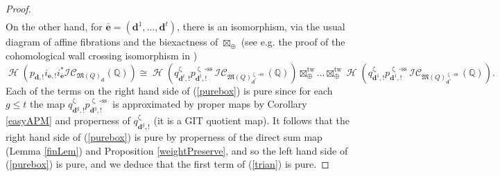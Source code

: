 \documentclass[a4paper,10pt]{amsart}
\newcommand{\dd}{\mathbf{d}}
\newcommand{\ee}{\mathbf{e}}
\newcommand{\Mst}{\mathfrak{M}}
\newcommand{\ICS}{\mathcal{IC}}
\renewcommand{\zeta}{\upzeta}
\DeclareMathOperator{\sst}{-ss}
\DeclareMathOperator{\tw}{tw}
\DeclareMathOperator{\Ho}{\mathcal{H}}
\begin{document}
\begin{proof}
\begin{align}
\end{align}
On the other hand, for $\overline{\ee}=(\dd^1,\ldots,\dd^t)$, there is an isomorphism, via the usual diagram of affine fibrations and the biexactness of $\boxtimes_{\oplus}$ (see e.g. the proof of the cohomological wall crossing isomorphism in \cite[Sec.4.2]{DaMe15b})
\begin{equation}
\label{purebox}
\Ho\left( p_{\dd,!}i_{\overline{\ee},!}i_{\overline{\ee}}^*\ICS_{\Mst(Q)_\dd}(\mathbb{Q})\right)\cong \Ho\left(q^{\zeta}_{\dd^t,!}p^{\zeta\sst}_{\dd^t,!}\ICS_{\Mst(Q)^{\zeta\sst}_{\dd^t}}(\mathbb{Q})\right)\boxtimes_{\oplus}^{\tw}\ldots\boxtimes_{\oplus}^{\tw}\Ho\left(q^{\zeta}_{\dd^1,!}p^{\zeta\sst}_{\dd^1,!}\ICS_{\Mst(Q)^{\zeta\sst}_{\dd^1}}(\mathbb{Q})\right).
\end{equation}
Each of the terms on the right hand side of (\ref{purebox}) is pure since for each $g\leq t$ the map $q^{\zeta}_{\dd^g,!}p^{\zeta\sst}_{\dd^g,!}$ is approximated by proper maps by Corollary \ref{easyAPM} and properness of $q^{\zeta}_{\dd^g,!}$ (it is a GIT quotient map).  It follows that the right hand side of (\ref{purebox}) is pure by properness of the direct sum map (Lemma \ref{finLem}) and Proposition \ref{weightPreserve}, and so the left hand side of (\ref{purebox}) is pure, and we deduce that the first term of (\ref{trian}) is pure.  


\end{proof}
\end{document}
